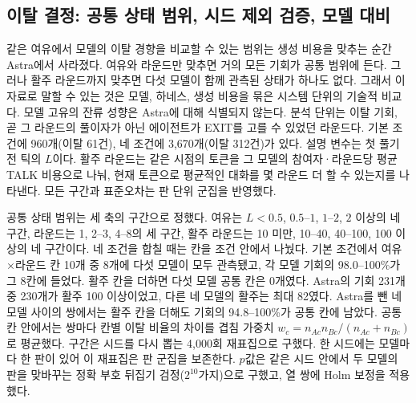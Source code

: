 \subsection{이탈 결정: 공통 상태 범위, 시드 제외 검증, 모델 대비}\label{val:w4-exit}

같은 여유에서 모델의 이탈 경향을 비교할 수 있는 범위는 생성 비용을 맞추는 순간 Astra에서 사라졌다. 여유와 라운드만 맞추면 거의 모든 기회가 공통 범위에 든다. 그러나 활주 라운드까지 맞추면 다섯 모델이 함께 관측된 상태가 하나도 없다. 그래서 이 자료로 말할 수 있는 것은 모델, 하네스, 생성 비용을 묶은 시스템 단위의 기술적 비교다. 모델 고유의 잔류 성향은 Astra에 대해 식별되지 않는다. 분석 단위는 이탈 기회, 곧 그 라운드의 풀이자가 아닌 에이전트가 EXIT를 고를 수 있었던 라운드다. 기본 조건에 960개(이탈 61건), 네 조건에 3,670개(이탈 312건)가 있다. 설명 변수는 첫 풀기 전 틱의 $L$이다. 활주 라운드는 같은 시점의 토큰을 그 모델의 참여자·라운드당 평균 TALK 비용으로 나눠, 현재 토큰으로 평균적인 대화를 몇 라운드 더 할 수 있는지를 나타낸다. 모든 구간과 표준오차는 판 단위 군집을 반영했다.

\begin{table}[h]
\centering
\caption{기본 조건 이탈 기회 960개의 로지스틱 회귀(1차 분석, 전체 표본 적합). 모델 효과는 Astra 기준 네 개의 가변수다. 활주 라운드와 $L$은 로그로 넣었다. 모델 효과가 있는 경우 $\log$ 활주 라운드는 $\log L$에 1인당 벌금과 모델 평균 TALK 비용의 로그를 더한 것과 같아, 모델 평균 비용은 모델 효과에 흡수되고 두 모형은 1인당 벌금 항만 다르다. 자기 이전 TALK 비용은 같은 판의 이전 라운드에서 그 에이전트가 쓴 라운드당 TALK 비용의 평균이며, 1라운드는 모델 평균으로 채웠다.}
\label{val:w4-tab-exit}
\small

\end{table}

공통 상태 범위는 세 축의 구간으로 정했다. 여유는 $L<0.5$, $0.5$--$1$, $1$--$2$, $2$ 이상의 네 구간, 라운드는 1, 2--3, 4--8의 세 구간, 활주 라운드는 10 미만, 10--40, 40--100, 100 이상의 네 구간이다. 네 조건을 합칠 때는 칸을 조건 안에서 나눴다. 기본 조건에서 여유$\times$라운드 칸 10개 중 8개에 다섯 모델이 모두 관측됐고, 각 모델 기회의 98.0--100\%가 그 8칸에 들었다. 활주 칸을 더하면 다섯 모델 공통 칸은 0개였다. Astra의 기회 231개 중 230개가 활주 100 이상이었고, 다른 네 모델의 활주는 최대 82였다. Astra를 뺀 네 모델 사이의 쌍에서는 활주 칸을 더해도 기회의 94.8--100\%가 공통 칸에 남았다. 공통 칸 안에서는 쌍마다 칸별 이탈 비율의 차이를 겹침 가중치 $w_c=n_{Ac}n_{Bc}/(n_{Ac}+n_{Bc})$로 평균했다. 구간은 시드를 다시 뽑는 4,000회 재표집으로 구했다. 한 시드에는 모델마다 한 판이 있어 이 재표집은 판 군집을 보존한다. $p$값은 같은 시드 안에서 두 모델의 판을 맞바꾸는 정확 부호 뒤집기 검정($2^{10}$가지)으로 구했고, 열 쌍에 Holm 보정을 적용했다.

